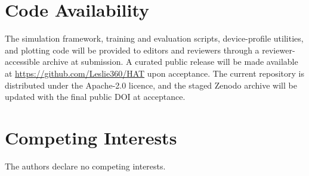 \section*{Code Availability}
The simulation framework, training and evaluation scripts, device-profile utilities, and plotting code will be provided to editors and reviewers through a reviewer-accessible archive at submission. A curated public release will be made available at \url{https://github.com/Leslie360/HAT} upon acceptance. The current repository is distributed under the Apache-2.0 licence, and the staged Zenodo archive will be updated with the final public DOI at acceptance.

\section*{Competing Interests}
The authors declare no competing interests.
